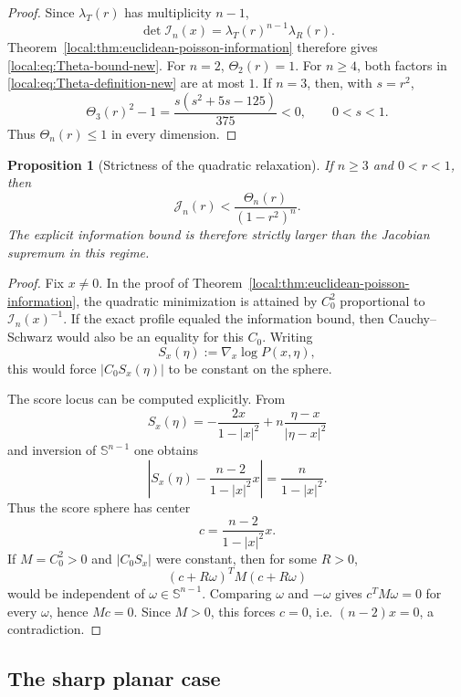 \documentclass[11pt,reqno]{amsart}
\newtheorem{proposition}[theorem]{Proposition}
\theoremstyle{remark}
\newcommand{\Sph}{\mathbb S}
\begin{document}
\begin{proof}
Since $\lambda_T(r)$ has multiplicity $n-1$,
\[
 \det\mathcal I_n(x)
 =
 \lambda_T(r)^{n-1}\lambda_R(r).
\]
Theorem~\ref{local:thm:euclidean-poisson-information} therefore gives
\eqref{local:eq:Theta-bound-new}.  For $n=2$, $\Theta_2(r)=1$.  For $n\ge4$,
both factors in \eqref{local:eq:Theta-definition-new} are at most $1$.  If $n=3$,
then, with $s=r^2$,
\[
 \Theta_3(r)^2-1
 =
 \frac{s(s^2+5s-125)}{375}<0,
 \qquad 0<s<1.
\]
Thus $\Theta_n(r)\le1$ in every dimension.
\end{proof}

\begin{proposition}[Strictness of the quadratic relaxation]
\label{local:prop:euclidean-information-rigidity}
If $n\ge3$ and $0<r<1$, then
\begin{equation}\label{local:eq:Jn-strict-information}
 \mathcal J_n(r)
 <
 \frac{\Theta_n(r)}{(1-r^2)^n}.
\end{equation}
The explicit information bound is therefore strictly larger than the
Jacobian supremum in this regime.
\end{proposition}

\begin{proof}
Fix $x\ne0$.  In the proof of Theorem~\ref{local:thm:euclidean-poisson-information},
the quadratic minimization is attained by
$C_0^2$ proportional to $\mathcal I_n(x)^{-1}$.  If the exact profile equaled
the information bound, then Cauchy--Schwarz would also be an equality for this
$C_0$.  Writing
\[
 S_x(\eta):=\nabla_x\log P(x,\eta),
\]
this would force $|C_0S_x(\eta)|$ to be constant on the sphere.

The score locus can be computed explicitly.  From
\[
 S_x(\eta)
 =
 -\frac{2x}{1-|x|^2}
 +n\frac{\eta-x}{|\eta-x|^2}
\]
and inversion of $\Sph^{n-1}$ one obtains
\begin{equation}\label{local:eq:score-sphere-new}
 \left|
 S_x(\eta)-\frac{n-2}{1-|x|^2}x
 \right|
 =
 \frac{n}{1-|x|^2}.
\end{equation}
Thus the score sphere has center
\[
 c=\frac{n-2}{1-|x|^2}x.
\]
If $M=C_0^2>0$ and $|C_0S_x|$ were constant, then for some $R>0$,
\[
 (c+R\omega)^TM(c+R\omega)
\]
would be independent of $\omega\in\Sph^{n-1}$.  Comparing $\omega$ and
$-\omega$ gives $c^TM\omega=0$ for every $\omega$, hence $Mc=0$.  Since
$M>0$, this forces $c=0$, i.e. $(n-2)x=0$, a contradiction.
\end{proof}

\subsection{The sharp planar case}
\end{document}
